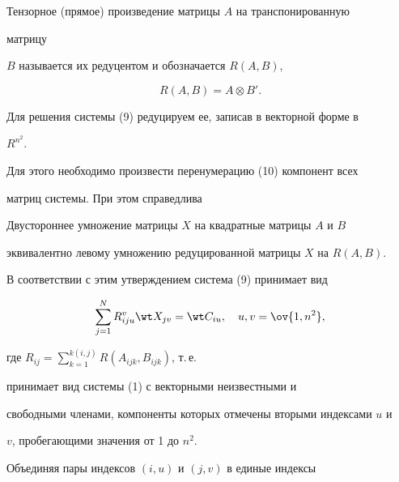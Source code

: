  


\begin{defn} 


Тензорное (прямое) произведение матрицы $A$ на транспонированную 


матрицу 


$B$ называется их редуцентом и обозначается $R(A,B)$, 


$$ 


R(A,B)=A\otimes B'. 


$$ 


\end{defn} 


 


Для решения системы (9) редуцируем ее, записав в векторной форме в 


$R^{n^2}$. 


Для этого необходимо произвести перенумерацию (10) компонент всех 


матриц системы. При этом справедлива \cite{2} 


 


\begin{lemnonum} 


Двустороннее умножение матрицы $X$ на квадратные матрицы $A$ и $B$ 


эквивалентно левому умножению редуцированной матрицы $X$ на $R(A,B)$. 


\end{lemnonum} 


 


В соответствии с этим утверждением система (9) принимает вид 


\begin{equation} 


\sum^N_{j=1}R_{iju}^v\wt X_{jv}=\wt C_{iu},\quad u,v=\ov{1,n^2}, 


\end{equation} 


где $R_{ij}=\sum\limits^{k(i,j)}_{k=1}R(A_{ijk}, B_{ijk})$, т.\,е.{} 


принимает вид системы (1) с векторными неизвестными и 


свободными членами, компоненты которых отмечены вторыми индексами $u$ и 


$v$, пробегающими значения от 1 до $n^2$. 


 


Объединяя пары индексов $(i,u)$ и $(j,v)$ в единые индексы 


